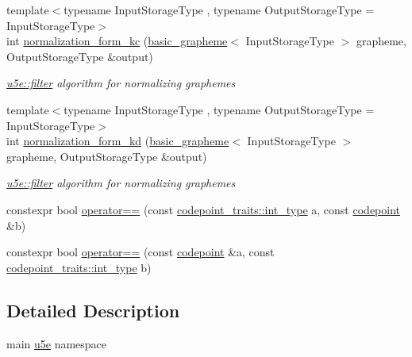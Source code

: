 \begin{DoxyCompactItemize}
{\footnotesize template$<$typename Input\+Storage\+Type , typename Output\+Storage\+Type  = Input\+Storage\+Type$>$ }\\int \hyperlink{namespaceu5e_a67caa33a03e9b645861525fcf447c845}{normalization\+\_\+form\+\_\+kc} (\hyperlink{classu5e_1_1basic__grapheme}{basic\+\_\+grapheme}$<$ Input\+Storage\+Type $>$ grapheme, Output\+Storage\+Type \&output)
\begin{DoxyCompactList}\small\item\em \hyperlink{namespaceu5e_a300b77046593bf5484867461ac65cb88}{u5e\+::filter} algorithm for normalizing graphemes \end{DoxyCompactList}\item 
{\footnotesize template$<$typename Input\+Storage\+Type , typename Output\+Storage\+Type  = Input\+Storage\+Type$>$ }\\int \hyperlink{namespaceu5e_a27fc11752025c4901b3fdb94f014af57}{normalization\+\_\+form\+\_\+kd} (\hyperlink{classu5e_1_1basic__grapheme}{basic\+\_\+grapheme}$<$ Input\+Storage\+Type $>$ grapheme, Output\+Storage\+Type \&output)
\begin{DoxyCompactList}\small\item\em \hyperlink{namespaceu5e_a300b77046593bf5484867461ac65cb88}{u5e\+::filter} algorithm for normalizing graphemes \end{DoxyCompactList}\end{DoxyCompactItemize}
{\bf }\par
\begin{DoxyCompactItemize}
\item 
constexpr bool \hyperlink{namespaceu5e_a4f3724ee30c4c3e163a382398980f713}{operator==} (const \hyperlink{classu5e_1_1codepoint__traits_a11f00d20915e28671519ef0c96fab05d}{codepoint\+\_\+traits\+::int\+\_\+type} a, const \hyperlink{classu5e_1_1codepoint}{codepoint} \&b)
\item 
constexpr bool \hyperlink{namespaceu5e_a38c53ea83db2e4b2a6cc4c3bb281d438}{operator==} (const \hyperlink{classu5e_1_1codepoint}{codepoint} \&a, const \hyperlink{classu5e_1_1codepoint__traits_a11f00d20915e28671519ef0c96fab05d}{codepoint\+\_\+traits\+::int\+\_\+type} b)
\end{DoxyCompactItemize}



\subsection{Detailed Description}
main \hyperlink{namespaceu5e}{u5e} namespace 

